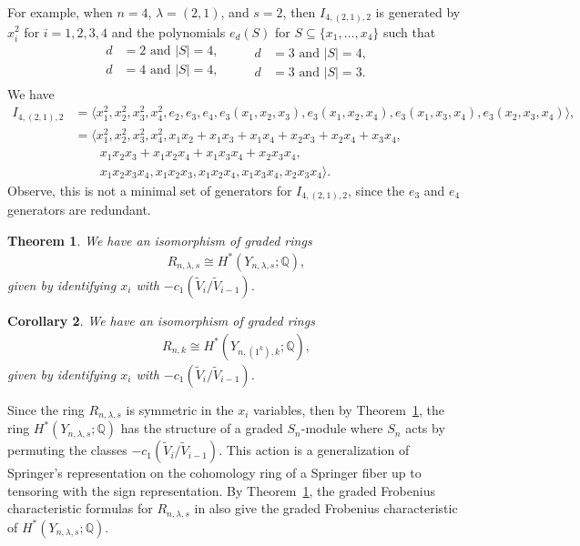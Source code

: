 \documentclass[submission]{FPSAC2021}
\theoremstyle{plain}
\newtheorem{theorem}{Theorem}[section]
\newtheorem{corollary}[theorem]{Corollary}
\newenvironment{example}
 {\pushQED{\qed}\examplex}
  {\popQED\endexamplex}
\numberwithin{equation}{section}
\newcommand{\bQ}{\mathbb{Q}}
\begin{document}
\begin{example}
For example, when $n=4$, $\lambda = (2,1)$, and $s=2$, then $I_{4,(2,1),2}$ is generated by $x_i^2$ for $i=1,2,3,4$ and the polynomials 
$e_d(S)$ for $S\subseteq \{x_1,\dots, x_4\}$ such that
\begin{equation*}
\begin{aligned}
	d &= 2 \text{ and }|S| = 4,\\
	d &= 4\text{ and }|S| = 4,\\
\end{aligned}
\qquad
\begin{aligned}
	d &= 3\text{ and }|S| = 4,\\
	d &= 3\text{ and }|S| = 3.
\end{aligned}
\end{equation*}
We have
\begin{align*}
    I_{4,(2,1),2} &= \langle x_1^2,x_2^2,x_3^2,x_4^2,e_2,e_3,e_4,e_3(x_1,x_2,x_3),e_3(x_1,x_2,x_4),e_3(x_1,x_3,x_4),e_3(x_2,x_3,x_4)\rangle,\\
    &= \langle x_1^2,x_2^2,x_3^2,x_4^2,x_1x_2+x_1x_3+x_1x_4+x_2x_3+x_2x_4+x_3x_4,\\
    &\qquad x_1x_2x_3+x_1x_2x_4+x_1x_3x_4+x_2x_3x_4,\\ 
    &\qquad x_1x_2x_3x_4, x_1x_2x_3,x_1x_2x_4,x_1x_3x_4,x_2x_3x_4\rangle.
\end{align*}
Observe, this is not a minimal set of generators for $I_{4,(2,1),2}$, since the $e_3$ and $e_4$ generators are redundant.
\end{example}

\begin{theorem}\label{thm:MainTheorem}
We have an isomorphism of graded rings
\begin{align}
R_{n,\lambda,s} \cong H^*(Y_{n,\lambda,s};\bQ),
\end{align}
given by identifying $x_i$ with $-c_1(\widetilde V_i/\widetilde V_{i-1})$.
\end{theorem}

\begin{corollary}
We have an isomorphism of graded rings
\begin{align}
R_{n,k} \cong H^*(Y_{n,(1^k),k};\bQ),
\end{align}
given by identifying $x_i$ with $-c_1(\widetilde V_i/\widetilde V_{i-1})$.
\end{corollary}



Since the ring $R_{n,\lambda,s}$ is symmetric in the $x_i$ variables, then by Theorem~\ref{thm:MainTheorem}, the ring $H^*(Y_{n,\lambda,s};\bQ)$ has the structure of a graded $S_n$-module where $S_n$ acts by permuting the classes $-c_1(\widetilde V_i/ \widetilde V_{i-1})$. This action is a generalization of Springer's representation on the cohomology ring of a Springer fiber up to tensoring with the sign representation. By Theorem~\ref{thm:MainTheorem}, the graded Frobenius characteristic formulas for $R_{n,\lambda,s}$ in \cite{GriffinOSP} also give the graded Frobenius characteristic of $H^*(Y_{n,\lambda,s};\bQ)$.
\end{document}
